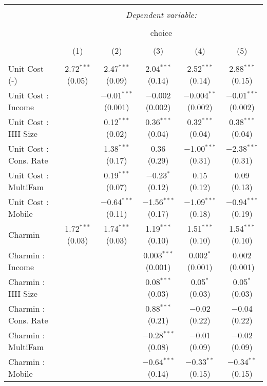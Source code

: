 
\begin{table}[!htbp] \centering 
  \caption{} 
  \label{tab:mnlDenverObsHet} 
\begin{tabular}{@{\extracolsep{5pt}}lccccc} 
\\[-1.8ex]\hline 
\hline \\[-1.8ex] 
 & \multicolumn{5}{c}{\textit{Dependent variable:}} \\ 
\cline{2-6} 
\\[-1.8ex] & \multicolumn{5}{c}{choice} \\ 
\\[-1.8ex] & (1) & (2) & (3) & (4) & (5)\\ 
\hline \\[-1.8ex] 
 Unit Cost (-) & 2.72$^{***}$ (0.05) & 2.47$^{***}$ (0.09) & 2.04$^{***}$ (0.14) & 2.52$^{***}$ (0.14) & 2.88$^{***}$ (0.15) \\ 
  Unit Cost : Income &  & $-$0.01$^{***}$ (0.001) & $-$0.002 (0.002) & $-$0.004$^{**}$ (0.002) & $-$0.01$^{***}$ (0.002) \\ 
  Unit Cost : HH Size &  & 0.12$^{***}$ (0.02) & 0.36$^{***}$ (0.04) & 0.32$^{***}$ (0.04) & 0.38$^{***}$ (0.04) \\ 
  Unit Cost : Cons. Rate &  & 1.38$^{***}$ (0.17) & 0.36 (0.29) & $-$1.00$^{***}$ (0.31) & $-$2.38$^{***}$ (0.31) \\ 
  Unit Cost : MultiFam &  & 0.19$^{***}$ (0.07) & $-$0.23$^{*}$ (0.12) & 0.15 (0.12) & 0.09 (0.13) \\ 
  Unit Cost : Mobile &  & $-$0.64$^{***}$ (0.11) & $-$1.56$^{***}$ (0.17) & $-$1.09$^{***}$ (0.18) & $-$0.94$^{***}$ (0.19) \\ 
  Charmin & 1.72$^{***}$ (0.03) & 1.74$^{***}$ (0.03) & 1.19$^{***}$ (0.10) & 1.51$^{***}$ (0.10) & 1.54$^{***}$ (0.10) \\ 
  Charmin : Income &  &  & 0.003$^{***}$ (0.001) & 0.002$^{*}$ (0.001) & 0.002 (0.001) \\ 
  Charmin : HH Size &  &  & 0.08$^{***}$ (0.03) & 0.05$^{*}$ (0.03) & 0.05$^{*}$ (0.03) \\ 
  Charmin : Cons. Rate &  &  & 0.88$^{***}$ (0.21) & $-$0.02 (0.22) & $-$0.04 (0.22) \\ 
  Charmin : MultiFam &  &  & $-$0.28$^{***}$ (0.08) & $-$0.01 (0.09) & $-$0.02 (0.09) \\ 
  Charmin : Mobile &  &  & $-$0.64$^{***}$ (0.14) & $-$0.33$^{**}$ (0.15) & $-$0.34$^{**}$ (0.15) \\ 

\end{tabular}
\end{table}
